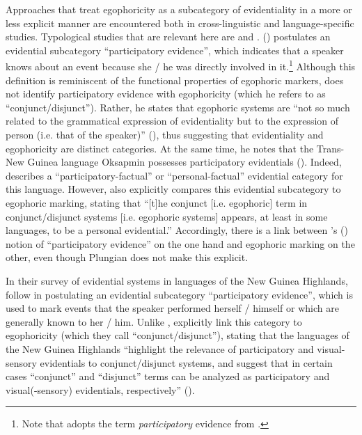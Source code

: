 \documentclass[output=paper]{langsci/langscibook}
\begin{document}
Approaches that treat egophoricity as a subcategory of evidentiality in a more or less explicit manner are encountered both in cross-linguistic and language-specific studies. Typological studies that are relevant here are \cite{Plungian2010} and \cite{SanRoqueLoughnane2012}. \citeauthor{Plungian2010} (\citeyear[34]{Plungian2010}) postulates an evidential subcategory “participatory evidence”, which indicates that a speaker knows about an event because she / he was directly involved in it.\footnote{Note that \cite{Plungian2010} adopts the term \emph{participatory} evidence from \cite{Oswalt1986}.} Although this definition is reminiscent of the functional properties of egophoric markers, \citeauthor{Plungian2010} does not identify participatory evidence with egophoricity (which he refers to as “conjunct/disjunct”). Rather, he states that egophoric systems are “not so much related to the grammatical expression of evidentiality but to the expression of person (i.e. that of the speaker)” (\citeyear[43]{Plungian2010}), thus suggesting that evidentiality and egophoricity are distinct categories. At the same time, he notes that the Trans-New Guinea language Oksapmin possesses participatory evidentials (\citeyear[34]{Plungian2010}).
Indeed, \cite{Loughnane2009} describes a “participatory-factual” or “personal-factual” evidential category for this language. However, \cite[253]{Loughnane2009} also explicitly compares this evidential subcategory to egophoric marking, stating that “[t]he conjunct [i.e. egophoric] term in conjunct/disjunct systems [i.e. egophoric systems] appears, at least in some languages, to be a personal evidential.” Accordingly, there is a link between \citeauthor{Plungian2010}’s (\citeyear{Plungian2010}) notion of “participatory evidence” on the one hand and egophoric marking on the other, even though Plungian does not make this explicit.

In their survey of evidential systems in languages of the New Guinea Highlands, \cite{SanRoqueLoughnane2012} follow \cite{Plungian2010} in postulating an evidential subcategory “participatory evidence”, which is used to mark events that the speaker performed herself / himself or which are generally known to her / him. Unlike \cite{Plungian2010}, \citeauthor{SanRoqueLoughnane2012} explicitly link this category to egophoricity (which they call “conjunct/disjunct”), stating that the languages of the New Guinea Highlands “highlight the relevance of participatory and visual-sensory evidentials to conjunct/disjunct systems, and suggest that in certain cases “conjunct” and “disjunct” terms can be analyzed as participatory and visual(-sensory) evidentials, respectively” (\citeyear[158]{SanRoqueLoughnane2012}).
\end{document}
